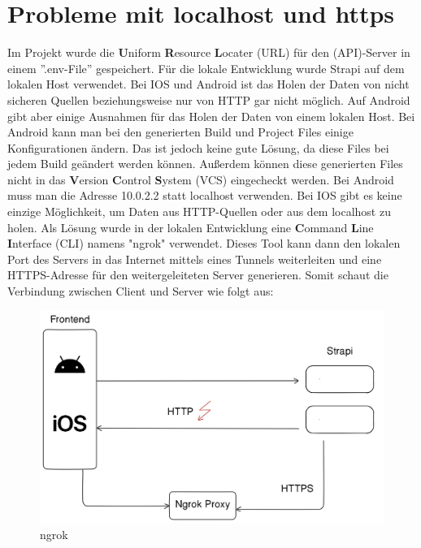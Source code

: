 

\section{Probleme mit localhost und https}\label{sec:probleme-mit-localhost-und-https}

Im Projekt wurde  die \textbf{U}niform \textbf{R}esource
\textbf{L}ocater (URL) für den (API)-Server in einem ''.env-File'' gespeichert.
Für die lokale Entwicklung wurde Strapi auf dem lokalen Host verwendet.
Bei IOS und Android ist das Holen der Daten von nicht sicheren Quellen
beziehungsweise nur von HTTP gar nicht möglich. Auf Android gibt aber einige
Ausnahmen für das Holen der Daten von einem lokalen Host.
Bei Android kann man bei den generierten Build und Project Files einige Konfigurationen ändern.
Das ist jedoch keine gute Lösung, da diese Files bei jedem Build geändert werden können.
Außerdem können diese generierten Files nicht in das \textbf{V}ersion \textbf{C}ontrol \textbf{S}ystem (VCS)
eingecheckt werden.
Bei Android muss man die Adresse 10.0.2.2 statt localhost verwenden.\cite{androidFetch}
Bei IOS gibt es keine einzige Möglichkeit,
um Daten aus HTTP-Quellen oder aus dem localhost zu holen.
Als Lösung wurde in der lokalen Entwicklung eine \textbf{C}ommand \textbf{L}ine \textbf{I}nterface (CLI) namens "ngrok" verwendet.
Dieses Tool kann dann den lokalen Port des Servers in das Internet mittels eines Tunnels weiterleiten
und eine HTTPS-Adresse für den weitergeleiteten Server generieren. Somit schaut die Verbindung zwischen Client und Server wie folgt aus:
\begin{figure}[H]
    \centering
    \includegraphics[width=\textwidth]{./pics/https-dev}
    \caption{ngrok}
\end{figure}

